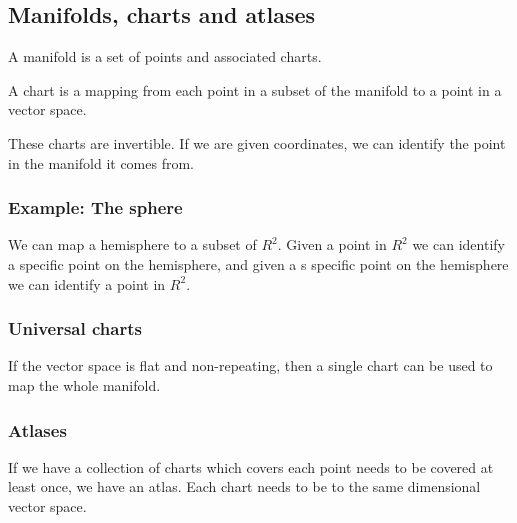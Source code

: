 
\subsection{Manifolds, charts and atlases}

A manifold is a set of points and associated charts.

A chart is a mapping from each point in a subset of the manifold to a point in a vector space.

These charts are invertible. If we are given coordinates, we can identify the point in the manifold it comes from.

\subsubsection{Example: The sphere}

We can map a hemisphere to a subset of \(R^2\). Given a point in \(R^2\) we can identify a specific point on the hemisphere, and given a s specific point on the hemisphere we can identify a point in \(R^2\).

\subsubsection{Universal charts}

If the vector space is flat and non-repeating, then a single chart can be used to map the whole manifold.

\subsubsection{Atlases}

If we have a collection of charts which covers each point needs to be covered at least once, we have an atlas. Each chart needs to be to the same dimensional vector space.


